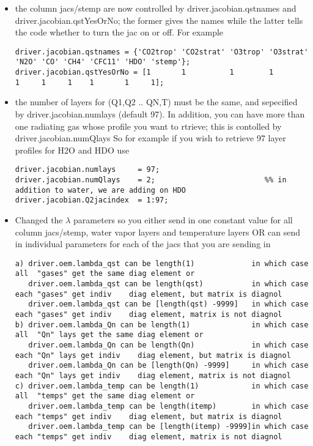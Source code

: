 \documentclass[11pt]{article}
\begin{document}
\begin{itemize}

\item the column jacs/stemp are now controlled by driver.jacobian.qstnames and driver.jacobian.qstYesOrNo; the former gives
      the names while the latter tells the code whether to turn the jac on or off. For example

\begin{verbatim}
driver.jacobian.qstnames = {'CO2trop' 'CO2strat' 'O3trop' 'O3strat' 'N2O' 'CO' 'CH4' 'CFC11' 'HDO' 'stemp'};
driver.jacobian.qstYesOrNo = [1       1          1        1         1     1     1    1       1     1];
\end{verbatim}

\item the number of layers for (Q1,Q2 .. QN,T) must be the same, and sepecified by driver.jacobian.numlays (default 97). In addition,
you can have more than one radiating gas whose profile you want to rtrieve; this is contolled by driver.jacobian.numQlays
So for example if you wish to retrieve 97 layer profiles for H2O and HDO use

\begin{verbatim}
driver.jacobian.numlays     = 97;
driver.jacobian.numQlays    = 2;                         %% in addition to water, we are adding on HDO
driver.jacobian.Q2jacindex  = 1:97;
\end{verbatim}

\item Changed the $\lambda$ parameters so you either send in one constant value for all column jacs/stemp, water vapor layers and
temperature layers OR can send in individual parameters for each of the jacs that you are sending in \\

\begin{small}
\begin{verbatim}
a) driver.oem.lambda_qst can be length(1)             in which case all  "gases" get the same diag element or
   driver.oem.lambda_qst can be length(qst)           in which case each "gases" get indiv    diag element, but matrix is diagnol
   driver.oem.lambda_qst can be [length(qst) -9999]   in which case each "gases" get indiv    diag element, matrix is not diagnol
b) driver.oem.lambda_Qn can be length(1)              in which case all  "Qn" lays get the same diag element or
   driver.oem.lambda_Qn can be length(Qn)             in which case each "Qn" lays get indiv    diag element, but matrix is diagnol
   driver.oem.lambda_Qn can be [length(Qn) -9999]     in which case each "Qn" lays get indiv    diag element, matrix is not diagnol
c) driver.oem.lambda_temp can be length(1)            in which case all  "temps" get the same diag element or
   driver.oem.lambda_temp can be length(itemp)        in which case each "temps" get indiv    diag element, but matrix is diagnol
   driver.oem.lambda_temp can be [length(itemp) -9999]in which case each "temps" get indiv    diag element, matrix is not diagnol
\end{verbatim}
\end{small}

\end{itemize}
\end{document}
